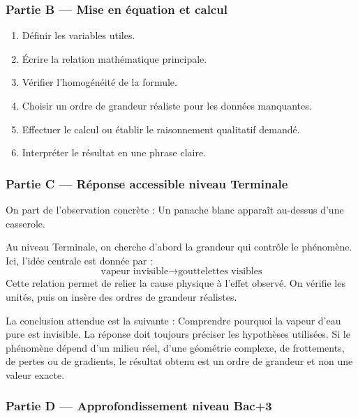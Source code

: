 \documentclass[11pt,a4paper]{article}
\begin{document}
\subsubsection*{Partie B — Mise en équation et calcul}

\begin{enumerate}
  \item Définir les variables utiles.
  \item Écrire la relation mathématique principale.
  \item Vérifier l'homogénéité de la formule.
  \item Choisir un ordre de grandeur réaliste pour les données manquantes.
  \item Effectuer le calcul ou établir le raisonnement qualitatif demandé.
  \item Interpréter le résultat en une phrase claire.
\end{enumerate}

\subsubsection*{Partie C — Réponse accessible niveau Terminale}

\begin{corrigebox}
On part de l'observation concrète : Un panache blanc apparaît au-dessus d'une casserole.

Au niveau Terminale, on cherche d'abord la grandeur qui contrôle le phénomène. Ici, l'idée centrale est donnée par :
\[
\text{vapeur invisible}\to\text{gouttelettes visibles}
\]
Cette relation permet de relier la cause physique à l'effet observé. On vérifie les unités, puis on insère des ordres de grandeur réalistes.

La conclusion attendue est la suivante : Comprendre pourquoi la vapeur d'eau pure est invisible. La réponse doit toujours préciser les hypothèses utilisées. Si le phénomène dépend d'un milieu réel, d'une géométrie complexe, de frottements, de pertes ou de gradients, le résultat obtenu est un ordre de grandeur et non une valeur exacte.
\end{corrigebox}

\subsubsection*{Partie D — Approfondissement niveau Bac+3}
\end{document}
